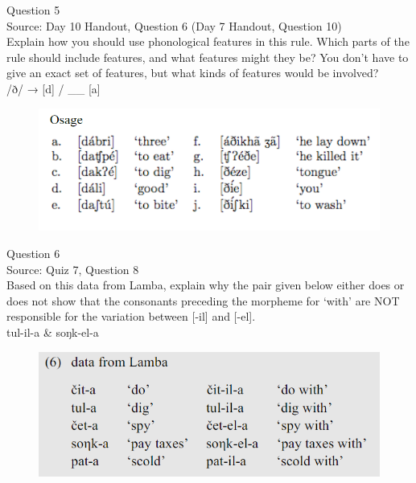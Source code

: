 \documentclass[12pt]{article}
\begin{document}
\newpage

{\large Question 5}\\

Source: Day 10 Handout, Question 6 (Day 7 Handout, Question 10)\\

Explain how you should use phonological features in this rule. Which parts of the rule should include features, and what features might they be? You don't have to give an exact set of features, but what kinds of features would be involved?\\

/ð/ → {[d]} / \_\_ {[a]}

\begin{figure}[H]
\includegraphics{../images/osage.png}
\end{figure}

\newpage

{\large Question 6}\\

Source: Quiz 7, Question 8\\

Based on this data from Lamba, explain why the pair given below either does or does not show that the consonants preceding the morpheme for `with' are NOT responsible for the variation between [-il] and [-el].\\

tul-il-a \& soŋk-el-a

\begin{figure}[H]
\includegraphics{../images/peng119_lamba.png}
\end{figure}
\end{document}
